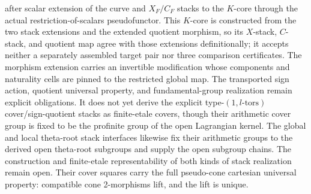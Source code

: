 \documentclass[11pt]{article}
\theoremstyle{plain}
\theoremstyle{definition}
\theoremstyle{remark}
\begin{document}
after scalar extension of the curve and \(X_F/C_F\) stacks to the \(K\)-core
through the actual restriction-of-scalars pseudofunctor.  This \(K\)-core is
constructed from the two stack extensions and the extended quotient morphism,
so its \(X\)-stack, \(C\)-stack, and quotient map agree with those extensions
definitionally; it accepts neither a separately assembled target pair nor
three comparison certificates.  The morphism extension carries an invertible
modification whose components and naturality cells are pinned to the restricted
global map.  The transported sign action, quotient universal property, and
fundamental-group realization remain explicit obligations.  It does not yet
derive the explicit type-\((1,l\text{-tors})\) cover/sign-quotient stacks as
finite-etale covers, though their arithmetic cover group is fixed to be the
profinite group of the open Lagrangian kernel.  The global and local
theta-root stack interfaces likewise fix their arithmetic groups to the
derived open theta-root subgroups and supply the open subgroup chains.  The construction and
finite-etale representability of both kinds of stack realization remain open.
Their cover squares carry
the full pseudo-cone cartesian universal property: compatible cone
2-morphisms lift, and the lift is unique.
\end{document}
